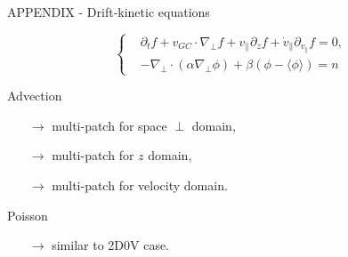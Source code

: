\documentclass[
	english,%
	logo=false,%
	eurofusion=false, %
	titlegraphic=true, %
	]{ippbeamer}
\begin{document}
\begin{frame}{APPENDIX - Drift-kinetic equations}
\vspace*{0.5cm}
\scriptsize

\begin{equation}
\left\{
\begin{aligned}
	&\partial_t f 
		+ v_{GC}\cdot \nabla_{\perp}f 
		+ v_{\parallel} \partial_z f 
		+ \dot{v}_{\parallel} \partial_{v_{\parallel}} f
		= 0, \\
	&-\nabla_{\perp} \cdot (\alpha\nabla_{\perp} \phi) + \beta (\phi - \langle\phi\rangle) = n
\end{aligned}
\right.
\end{equation}

\vspace*{0.5cm}
Advection
\begin{itemize}
	\item[$\rightarrow$] multi-patch for space $\perp$ domain, 
	\item[$\rightarrow$] multi-patch for $z$ domain, 
	\item[$\rightarrow$] multi-patch for velocity domain.
\end{itemize}

\vspace*{0.25cm}
Poisson
\begin{itemize}
	\item[$\rightarrow$] similar to 2D0V case.
\end{itemize}
\end{frame}
\end{document}
